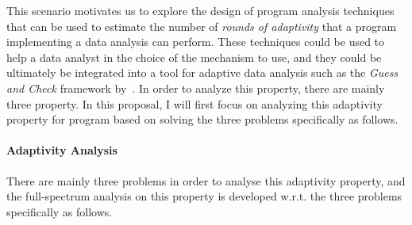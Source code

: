 This scenario motivates us to explore the design of program analysis techniques that can be used to estimate the number of \emph{rounds of adaptivity} that a program implementing a data analysis can perform. These techniques could be used to help a data analyst in the choice of the mechanism to use,
and they
could be ultimately be integrated into a tool for adaptive data analysis such as the \emph{Guess and Check} framework by~\cite{RogersRSSTW20}. 
%
In order to analyze this property, there are mainly three property. 
In this proposal, I will first focus on analyzing 
this adaptivity property for program based on solving the three problems specifically as follows.

\paragraph*{Adaptivity Analysis}
There are mainly three problems in order to analyse this adaptivity property, 
and the full-spectrum analysis on this property is 
developed w.r.t. the three problems specifically as follows.

